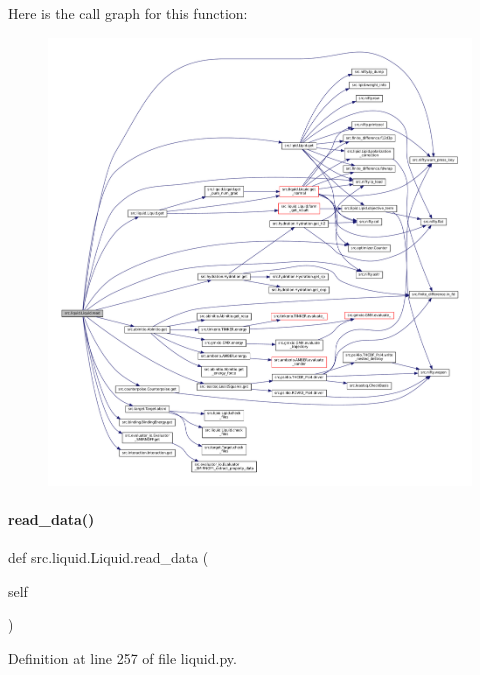 Here is the call graph for this function\+:
\nopagebreak
\begin{figure}[H]
\begin{center}
\leavevmode
\includegraphics[width=350pt]{classsrc_1_1liquid_1_1Liquid_ac70bf9d77fc3969a27a5ddba3ba4eb3a_cgraph}
\end{center}
\end{figure}
\mbox{\label{classsrc_1_1liquid_1_1Liquid_adb6661611a77152b1442392bf4e0c303}} 
\paragraph{\texorpdfstring{read\+\_\+data()}{read\_data()}}
{\footnotesize\ttfamily def src.\+liquid.\+Liquid.\+read\+\_\+data (\begin{DoxyParamCaption}\item[{}]{self }\end{DoxyParamCaption})}



Definition at line 257 of file liquid.\+py.

\mbox{\label{classsrc_1_1liquid_1_1Liquid_adb3676bf501d6683c2a8f36b10270a82}} 
